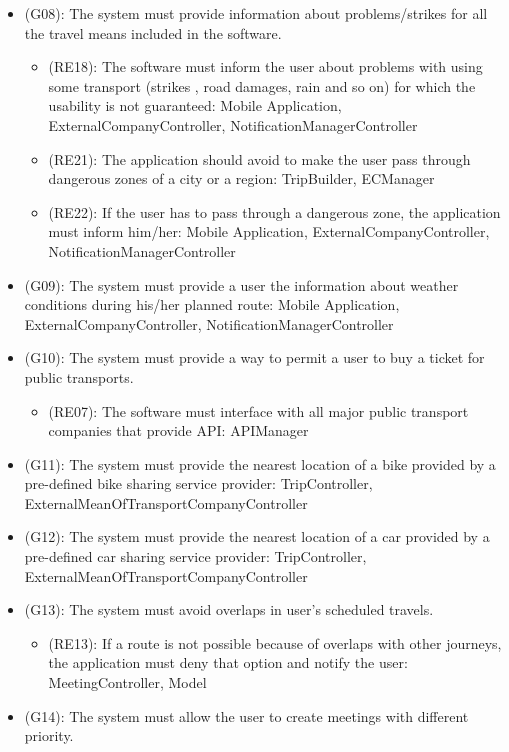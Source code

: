 \documentclass[a4paper,leqno]{article}
\begin{document}
\begin{itemize}
\begin{itemize}
	\end{itemize}
	\item (G08): The system must provide information about problems/strikes for all the travel means  included in the software.
	\begin{itemize}
		\item (RE18): The software must inform the user about problems with using some transport (strikes , road damages, rain and so on) for which the usability is not guaranteed: Mobile Application, ExternalCompanyController, NotificationManagerController
		\item (RE21): The application should avoid to make the user pass through dangerous zones of a city or a region: TripBuilder, ECManager
		\item (RE22): If the user has to pass through a dangerous zone, the application must inform him/her: Mobile Application, ExternalCompanyController, NotificationManagerController
	\end{itemize}
	\item (G09): The system must provide a user the information about weather conditions during his/her planned route: Mobile Application, ExternalCompanyController, NotificationManagerController
	\item (G10): The system must provide a way to permit a user to buy a ticket for public transports.
	\begin{itemize}
		\item (RE07): The software must interface with all major public transport companies that provide API: APIManager
	\end{itemize}
	\item (G11): The system must provide the nearest location of a bike provided by a pre-defined bike sharing service provider: TripController, ExternalMeanOfTransportCompanyController
	\item (G12): The system must provide the nearest location of a car provided by a pre-defined car sharing service provider: TripController, ExternalMeanOfTransportCompanyController
	\item (G13): The system must avoid overlaps in user's scheduled travels.
	\begin{itemize}
		\item (RE13): If a route is not possible because of overlaps with other journeys, the application must deny that option and notify the user: MeetingController, Model
	\end{itemize}
	\item (G14): The system must allow the user to create meetings with different priority.

\end{itemize}
\end{document}
